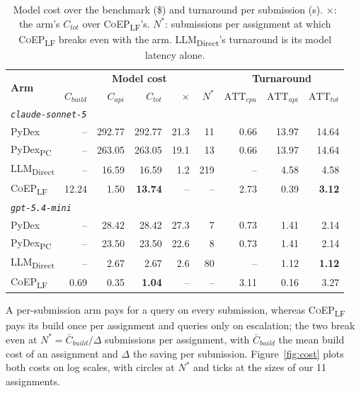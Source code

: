 \documentclass[acmsmall,screen,review,anonymous,nonacm]{acmart}
\newcommand{\coepLF}{\textsc{CoEP}\textsubscript{LF}\xspace}
\newcommand{\pydexPC}{PyDex\textsubscript{PC}\xspace}
\newcommand{\direct}{LLM\textsubscript{Direct}\xspace}
\newcommand{\V}[1]{\ensuremath{\mathit{#1}}}
\newcommand{\cs}{\texttt{claude-sonnet-5}\xspace}
\newcommand{\gm}{\texttt{gpt-5.4-mini}\xspace}
\begin{document}
\begin{table}[t]
\caption{Model cost over the benchmark (\$) and turnaround per submission (s). $\times$: the arm's $C_{\V{tot}}$ over \coepLF's. $N^{*}$: submissions per assignment at which \coepLF breaks even with the arm. \direct's turnaround is its model latency alone.}
\label{tab:cost}
\centering
\small
\begin{tabular}{l||rrr|rr||rrr}
\toprule
\multirow{2}{*}{\textbf{Arm}} & \multicolumn{5}{c||}{\textbf{Model cost}} & \multicolumn{3}{c}{\textbf{Turnaround}} \\
\cline{2-9}
 & $C_{\V{build}}$ & $C_{\V{api}}$ & $C_{\V{tot}}$ & $\times$ & $N^{*}$ & $\mathrm{ATT}_{\V{cpu}}$ & $\mathrm{ATT}_{\V{api}}$ & $\mathrm{ATT}_{\V{tot}}$ \\
\midrule\midrule
\multicolumn{9}{l}{\emph{\cs}} \\
PyDex~\cite{zhang2024pydex} & -- & 292.77 & 292.77 & 21.3 & 11 & 0.66 & 13.97 & 14.64 \\
\pydexPC & -- & 263.05 & 263.05 & 19.1 & 13 & 0.66 & 13.97 & 14.64 \\
\direct & -- & 16.59 & 16.59 & 1.2 & 219 & -- & 4.58 & 4.58 \\
\coepLF & 12.24 & 1.50 & \textbf{13.74} & -- & -- & 2.73 & 0.39 & \textbf{3.12} \\
\midrule
\multicolumn{9}{l}{\emph{\gm}} \\
PyDex~\cite{zhang2024pydex} & -- & 28.42 & 28.42 & 27.3 & 7 & 0.73 & 1.41 & 2.14 \\
\pydexPC & -- & 23.50 & 23.50 & 22.6 & 8 & 0.73 & 1.41 & 2.14 \\
\direct & -- & 2.67 & 2.67 & 2.6 & 80 & -- & 1.12 & \textbf{1.12} \\
\coepLF & 0.69 & 0.35 & \textbf{1.04} & -- & -- & 3.11 & 0.16 & 3.27 \\
\bottomrule
\end{tabular}
\end{table}

A per-submission arm pays for a query on every submission, whereas \coepLF pays its build once per assignment and queries only on escalation; the two break even at $N^{*} = \bar{C}_{\V{build}} / \Delta$ submissions per assignment, with $\bar{C}_{\V{build}}$ the mean build cost of an assignment and $\Delta$ the saving per submission. Figure~\ref{fig:cost} plots both costs on log scales, with circles at $N^{*}$ and ticks at the sizes of our 11 assignments.
\end{document}
